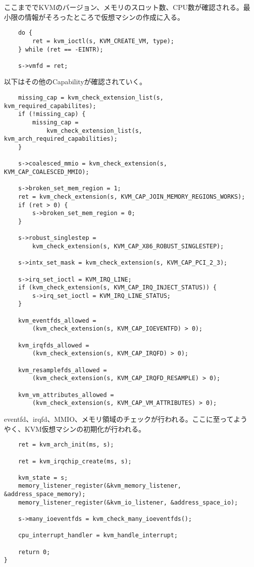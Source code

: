 \documentclass[9pt,b5paper,tombo]{jsbook}
\begin{document}
ここまででKVMのバージョン、メモリのスロット数、CPU数が確認される。最小限の情報がそろったところで仮想マシンの作成に入る。

\begin{lstlisting}
    do {
        ret = kvm_ioctl(s, KVM_CREATE_VM, type);
    } while (ret == -EINTR);

    s->vmfd = ret;
\end{lstlisting}

以下はその他のCapabilityが確認されていく。

\begin{lstlisting}
    missing_cap = kvm_check_extension_list(s, kvm_required_capabilites);
    if (!missing_cap) {
        missing_cap =
            kvm_check_extension_list(s, kvm_arch_required_capabilities);
    }

    s->coalesced_mmio = kvm_check_extension(s, KVM_CAP_COALESCED_MMIO);

    s->broken_set_mem_region = 1;
    ret = kvm_check_extension(s, KVM_CAP_JOIN_MEMORY_REGIONS_WORKS);
    if (ret > 0) {
        s->broken_set_mem_region = 0;
    }

    s->robust_singlestep =
        kvm_check_extension(s, KVM_CAP_X86_ROBUST_SINGLESTEP);

    s->intx_set_mask = kvm_check_extension(s, KVM_CAP_PCI_2_3);

    s->irq_set_ioctl = KVM_IRQ_LINE;
    if (kvm_check_extension(s, KVM_CAP_IRQ_INJECT_STATUS)) {
        s->irq_set_ioctl = KVM_IRQ_LINE_STATUS;
    }

    kvm_eventfds_allowed =
        (kvm_check_extension(s, KVM_CAP_IOEVENTFD) > 0);

    kvm_irqfds_allowed =
        (kvm_check_extension(s, KVM_CAP_IRQFD) > 0);

    kvm_resamplefds_allowed =
        (kvm_check_extension(s, KVM_CAP_IRQFD_RESAMPLE) > 0);

    kvm_vm_attributes_allowed =
        (kvm_check_extension(s, KVM_CAP_VM_ATTRIBUTES) > 0);
\end{lstlisting}

eventfd、irqfd、MMIO、メモリ領域のチェックが行われる。ここに至ってようやく、KVM仮想マシンの初期化が行われる。

\begin{lstlisting}
    ret = kvm_arch_init(ms, s);

    ret = kvm_irqchip_create(ms, s);

    kvm_state = s;
    memory_listener_register(&kvm_memory_listener, &address_space_memory);
    memory_listener_register(&kvm_io_listener, &address_space_io);

    s->many_ioeventfds = kvm_check_many_ioeventfds();

    cpu_interrupt_handler = kvm_handle_interrupt;

    return 0;
}
\end{lstlisting}
\end{document}
